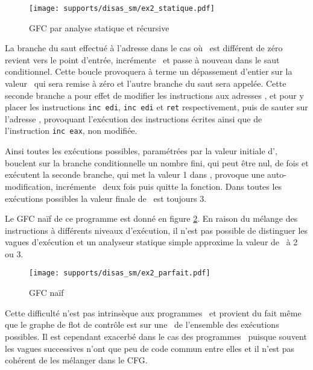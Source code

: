 \begin{figure}[h]
\begin{center}
\texttt{[image: supports/disas\_sm/ex2\_statique.pdf]}
\caption{GFC par analyse statique et récursive}
\label{fig:sm_cfg_statique}
\end{center}
\end{figure}


La branche du saut effectué à l'adresse  dans le cas où \eax\ est différent de zéro revient vers le point d'entrée, incrémente \eax\ et passe à nouveau dans le saut conditionnel. Cette boucle provoquera à terme un dépassement d'entier sur la valeur \eax\ qui sera remise à zéro et l'autre branche du saut sera appelée.
Cette seconde branche a pour effet de modifier les instructions aux adresses ,  et  pour y placer les instructions \texttt{inc edi}, \texttt{inc edi} et \texttt{ret} respectivement, puis de sauter sur l'adresse , provoquant l'exécution des instructions écrites ainsi que de l'instruction \texttt{inc eax}, non modifiée.

Ainsi toutes les exécutions possibles, paramétrées par la valeur initiale d'\eax, bouclent sur la branche conditionnelle un nombre fini, qui peut être nul, de fois et exécutent la seconde branche, qui met la valeur 1 dans \edi, provoque une auto-modification, incrémente \edi\ deux fois puis quitte la fonction. Dans toutes les exécutions possibles la valeur finale de \edi\ est toujours 3.

Le GFC naïf de ce programme est donné en figure \ref{fig:sm_cfg_parfait}. En raison du mélange des instructions à différents niveaux d'exécution, il n'est pas possible de distinguer les vagues d'exécution et un analyseur statique simple approxime la valeur de \edi\ à 2 ou 3.

\begin{figure}[h]
\begin{center}
  \texttt{[image: supports/disas\_sm/ex2\_parfait.pdf]}
\end{center}
\caption{GFC naïf}
\label{fig:sm_cfg_parfait}
\end{figure}



Cette difficulté n'est pas intrinsèque aux programmes \sm\ et provient du fait même que le graphe de flot de contrôle est sur une \sura\ de l'ensemble des exécutions possibles. Il est cependant exacerbé dans le cas des programmes \sm\ puisque souvent les vagues successives n'ont que peu de code commun entre elles et il n'est pas cohérent de les mélanger dans le CFG.


